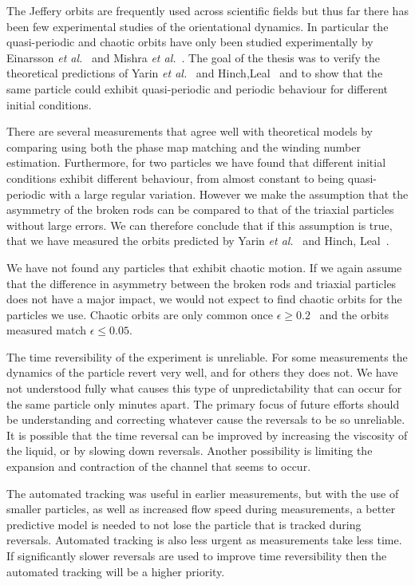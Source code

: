The Jeffery orbits are frequently used across scientific fields \cite{Tolga}\cite{geology} but thus far there has been few experimental studies 
of the orientational dynamics. In particular the quasi-periodic and chaotic orbits have only been studied experimentally
by Einarsson \emph{et al.}~\cite{JonasExperiment} and Mishra \emph{et al.}~\cite{Mishra}.
The goal of the thesis was to verify the theoretical predictions of Yarin \emph{et al.}~\cite{Yarin} and Hinch,Leal~\cite{Leal} and to show that the same particle could exhibit quasi-periodic and periodic behaviour for different initial conditions.


There are several measurements that agree well with theoretical models by comparing using both the phase map matching and the winding number estimation. Furthermore, for two particles we have found that different initial conditions exhibit different behaviour, 
from almost constant to being quasi-periodic with a large regular variation. However we make the assumption that the asymmetry of the broken rods can be compared to that of the triaxial particles without large errors. We can therefore conclude that if this assumption is true, that we have measured the
orbits predicted by Yarin \emph{et al.}~\cite{Yarin} and Hinch, Leal~\cite{Leal}.

We have not found any particles that exhibit chaotic motion. If we again assume that the difference in asymmetry between the broken rods and triaxial particles does not have a major impact, we would not expect to find chaotic orbits for the particles we use. Chaotic orbits are only common once $\epsilon \geq 0.2$~\cite{AntonThesis} and the orbits measured match $\epsilon \leq 0.05$. 

The time reversibility of the experiment is unreliable. For some measurements the dynamics of the particle revert very well, and for others they does not. 
We have not understood fully what causes this type of unpredictability that can occur for the same particle only 
minutes apart. The primary focus of future efforts should be understanding and correcting whatever cause the 
reversals to be so unreliable. It is possible that the time reversal can be improved by increasing the viscosity of the liquid, or by slowing down reversals. Another possibility is limiting the expansion and contraction of the channel that seems to occur.

The automated tracking was useful in earlier measurements, but with the use of smaller particles, as well as increased flow speed during measurements, 
a better predictive model is needed to not lose the particle that is tracked during reversals. Automated tracking is also less urgent as
measurements take less time. If significantly slower reversals are used to improve time reversibility then the automated tracking will be a higher priority.